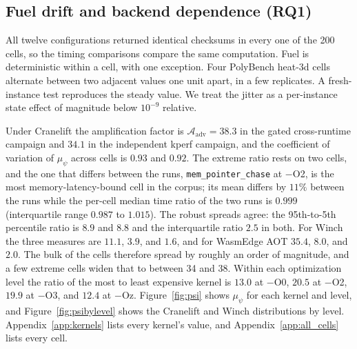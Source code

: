 \documentclass{ws-jcsc}
\begin{document}
\subsection{Fuel drift and backend dependence (RQ1)}
\label{sec:rq1}
All twelve configurations returned identical checksums in every one of the 200 cells, so the timing comparisons compare the same computation. Fuel is deterministic within a cell, with one exception. Four PolyBench heat-3d cells alternate between two adjacent values one unit apart, in a few replicates. A fresh-instance test reproduces the steady value. We treat the jitter as a per-instance state effect of magnitude below $10^{-9}$ relative.

Under Cranelift the amplification factor is $\mathcal{A}_{\mathrm{adv}}=38.3$ in the gated cross-runtime campaign and $34.1$ in the independent kperf campaign, and the coefficient of variation of $\mu_\psi$ across cells is $0.93$ and $0.92$. The extreme ratio rests on two cells, and the one that differs between the runs, \texttt{mem\_pointer\_chase} at $-$O2, is the most memory-latency-bound cell in the corpus; its mean differs by $11\%$ between the runs while the per-cell median time ratio of the two runs is $0.999$ (interquartile range $0.987$ to $1.015$). The robust spreads agree: the 95th-to-5th percentile ratio is $8.9$ and $8.8$ and the interquartile ratio $2.5$ in both. For Winch the three measures are $11.1$, $3.9$, and $1.6$, and for WasmEdge AOT $35.4$, $8.0$, and $2.0$. The bulk of the cells therefore spread by roughly an order of magnitude, and a few extreme cells widen that to between 34 and 38. Within each optimization level the ratio of the most to least expensive kernel is $13.0$ at $-$O0, $20.5$ at $-$O2, $19.9$ at $-$O3, and $12.4$ at $-$Oz. Figure~\ref{fig:psi} shows $\mu_\psi$ for each kernel and level, and Figure~\ref{fig:psibylevel} shows the Cranelift and Winch distributions by level. Appendix~\ref{app:kernels} lists every kernel's value, and Appendix~\ref{app:all_cells} lists every cell.
\end{document}
